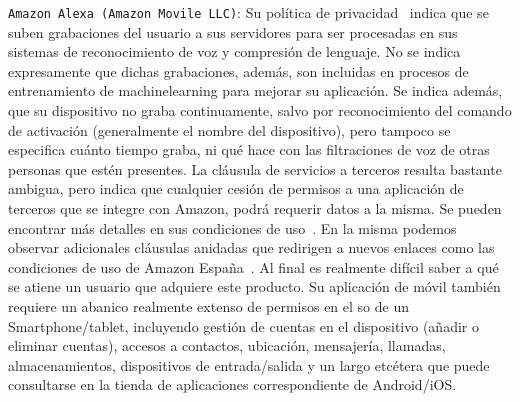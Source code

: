 \vspace{1cm}

\verb|Amazon Alexa (Amazon Movile LLC)|: Su política de privacidad~\cite{alexaprivacy} indica que se suben grabaciones del usuario a sus servidores para ser procesadas en sus sistemas de reconocimiento de voz y compresión de lenguaje. No se indica expresamente que dichas grabaciones, además, son incluidas en procesos de entrenamiento de \gls{machinelearning} para mejorar su aplicación. Se indica además, que su dispositivo no graba continuamente, salvo por reconocimiento del comando de activación (generalmente el nombre del dispositivo), pero tampoco se especifica cuánto tiempo graba, ni qué hace con las filtraciones de voz de otras personas que estén presentes. La cláusula de servicios a terceros resulta bastante ambigua, pero indica que cualquier cesión de permisos a una aplicación de terceros que se integre con Amazon, podrá requerir datos a la misma. Se pueden encontrar más detalles en sus condiciones de uso~\cite{Alexauserconditions}. En la misma podemos observar adicionales cláusulas anidadas que redirigen a nuevos enlaces como las condiciones de uso de Amazon España~\cite{Alexaspainuserconditions}. Al final es realmente difícil saber a qué se atiene un usuario que adquiere este producto. Su aplicación de móvil también requiere un abanico realmente extenso de permisos en el \gls{so} de un Smartphone/tablet, incluyendo gestión de cuentas en el dispositivo (añadir o eliminar cuentas), accesos a contactos, ubicación, mensajería, llamadas, almacenamientos, dispositivos de entrada/salida y un largo etcétera que puede consultarse en la tienda de aplicaciones correspondiente de Android/iOS.

\vspace{1cm}

